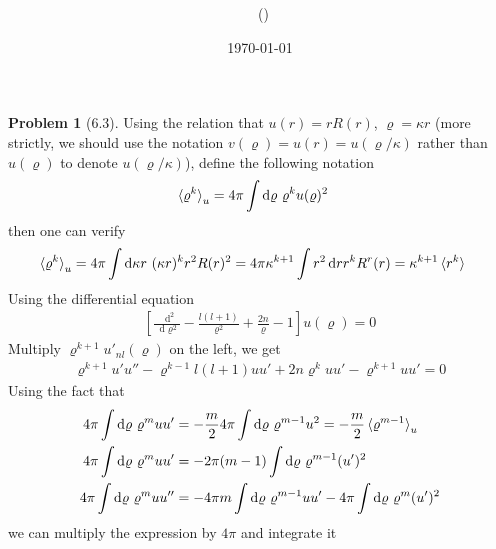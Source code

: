 \documentclass[twoside,11pt]{article}
\title{{\lms \Code \ \Ass}}
\author{\lms \name \ (\href{mailto:\mail}{\mail})}
\date{\sffamily \today}
\makeatletter
\renewcommand*\d{\mathop{}\!\mathrm{d}}
\theoremstyle{definition}
\newtheorem{problem}{Problem}
\theoremstyle{remark}
\newtheorem*{remark}{Remark}
\renewcommand{\maketitle}{\bgroup\setlength{\parindent}{0pt}
\begin{flushleft}
  \textbf{\Large\@title}

  \@author
\end{flushleft}\egroup
}
\makeatother
\begin{document}
\maketitle
\thispagestyle{title}


\begin{problem}[6.3]
Using the relation that $u(r) = rR(r)$, $\varrho=\kappa r$
(more strictly, we should use the notation $v(\varrho)=u(r)=u(\varrho/\kappa)$ rather than $u(\varrho)$
to denote $u(\varrho/\kappa)$),
define the following notation
\begin{align*}
    \braket{\varrho^k}_u &= 4\pi\int\d \varrho\ \varrho^k u(\varrho)^2
\end{align*}
then one can verify
\begin{align*}
    \braket{\varrho^k}_u &= 4\pi\int\d \kappa r\ (\kappa r)^k r^2 R(r)^2
    =4\pi\kappa^{k+1} \int r^2\d r r^kR^r(r) = \kappa^{k+1}\braket{r^k}
\end{align*}
Using the differential equation
\begin{align}
    \left[
        \frac{\d^2}{\d\varrho^2} - \frac{l(l+1)}{\varrho^2} + \frac{2n}{\varrho} - 1
    \right]u(\varrho) = 0
\end{align}
Multiply $\varrho^{k+1}u'_{nl}(\varrho)$ on the left, we get
\begin{align*}
    \varrho^{k+1}u'u'' - \varrho^{k-1}l(l+1)uu' + 2n\varrho^k uu' - \varrho^{k+1}uu' = 0
\end{align*}
Using the fact that
\begin{align*}
    4\pi\int\d\varrho\ \varrho^m uu' &= -\frac{m}{2}4\pi\int\d\varrho\ \varrho^{m-1}u^2
    = -\frac{m}{2}\braket{\varrho^{m-1}}_u\\
    4\pi\int\d\varrho\ \varrho^m uu' &= -2\pi(m-1)\int\d\varrho\ \varrho^{m-1} (u')^2\\
    4\pi\int\d\varrho\ \varrho^m uu'' &= -4\pi m\int\d\varrho\ \varrho^{m-1}uu' -4\pi\int\d\varrho\
    \varrho^m (u')^2
\end{align*}
we can multiply the expression by $4\pi$ and integrate it
\begin{align}

\end{align}
\end{problem}
\end{document}
